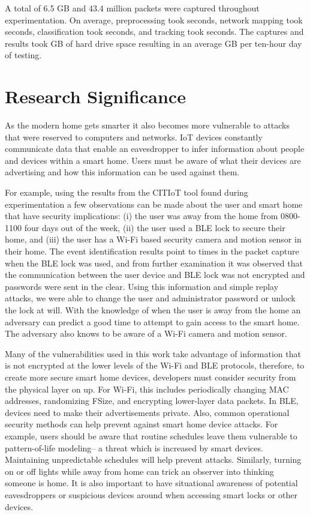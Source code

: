 \documentclass[12pt,letterpaper,oneside]{book}
\begin{document}
		A total of 6.5 GB and 43.4 million packets were captured throughout experimentation. On average, preprocessing took seconds, network mapping took seconds, classification took seconds, and tracking took seconds. The captures and results took GB of hard drive space resulting in an average GB per ten-hour day of testing.
		
		
		\section{Research Significance} \label{researchSignificance}
		As the modern home gets smarter it also becomes more vulnerable to attacks that were reserved to computers and networks. \ac{IoT} devices constantly communicate data that enable an eavesdropper to infer information about people and devices within a smart home. Users must be aware of what their devices are advertising and how this information can be used against them. 
		
		For example, using the results from the \ac{CITIoT} tool found during experimentation a few observations can be made about the user and smart home that have security implications: (i) the user was away from the home from 0800-1100 four days out of the week, (ii) the user used a \ac{BLE} lock to secure their home, and (iii) the user has a Wi-Fi based security camera and motion sensor in their home. The event identification results point to times in the packet capture when the \ac{BLE} lock was used, and from further examination it was observed that the communication between the user device and \ac{BLE} lock was not encrypted and passwords were sent in the clear. Using this information and simple replay attacks, we were able to change the user and administrator password or unlock the lock at will. With the knowledge of when the user is away from the home an adversary can predict a good time to attempt to gain access to the smart home. The adversary also knows to be aware of a Wi-Fi camera and motion sensor.
		
		Many of the vulnerabilities used in this work take advantage of information that is not encrypted at the lower levels of the Wi-Fi and \ac{BLE} protocols, therefore, to create more secure smart home devices, developers must consider security from the physical layer on up. For Wi-Fi, this includes periodically changing \ac{MAC} addresses, randomizing \ac{FSize}, and encrypting lower-layer data packets. In \ac{BLE}, devices need to make their advertisements private. Also, common operational security methods can help prevent against smart home device attacks. For example, users should be aware that routine schedules leave them vulnerable to pattern-of-life modeling-- a threat which is increased by smart devices. Maintaining unpredictable schedules will help prevent attacks. Similarly, turning on or off lights while away from home can trick an observer into thinking someone is home. It is also important to have situational awareness of potential eavesdroppers or suspicious devices around when accessing smart locks or other devices.
		
\end{document}
